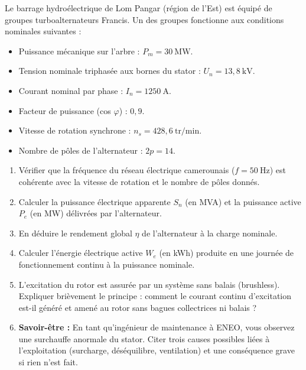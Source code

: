 \documentclass[11pt]{article}
\begin{document}
\begin{exercice}
\label{exo:probatoire_lom_pangar}
Le barrage hydroélectrique de Lom Pangar (région de l'Est) est équipé de groupes turboalternateurs Francis. Un des groupes fonctionne aux conditions nominales suivantes :
\begin{itemize}
    \item Puissance mécanique sur l'arbre : $P_m = 30~\text{MW}$.
    \item Tension nominale triphasée aux bornes du stator : $U_n = 13,8~\text{kV}$.
    \item Courant nominal par phase : $I_n = 1250~\text{A}$.
    \item Facteur de puissance (cos $\varphi$) : $0,9$.
    \item Vitesse de rotation synchrone : $n_s = 428,6~\text{tr/min}$.
    \item Nombre de pôles de l'alternateur : $2p = 14$.
\end{itemize}
\begin{enumerate}
    \item Vérifier que la fréquence du réseau électrique camerounais ($f = 50~\text{Hz}$) est cohérente avec la vitesse de rotation et le nombre de pôles donnés.
    \item Calculer la puissance électrique apparente $S_n$ (en MVA) et la puissance active $P_e$ (en MW) délivrées par l'alternateur.
    \item En déduire le rendement global $\eta$ de l'alternateur à la charge nominale.
    \item Calculer l'énergie électrique active $W_e$ (en kWh) produite en une journée de fonctionnement continu à la puissance nominale.
    \item L'excitation du rotor est assurée par un système sans balais (brushless). Expliquer brièvement le principe : comment le courant continu d'excitation est-il généré et amené au rotor sans bagues collectrices ni balais ?
    \item \textbf{Savoir-être :} En tant qu'ingénieur de maintenance à ENEO, vous observez une surchauffe anormale du stator. Citer trois causes possibles liées à l'exploitation (surcharge, déséquilibre, ventilation) et une conséquence grave si rien n'est fait.
\end{enumerate}
\end{exercice}
\end{document}
